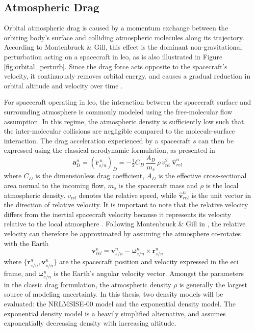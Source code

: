 \subsection{Atmospheric Drag}
\label{sec:atmospheric_drag}
Orbital atmospheric drag is caused by a momentum exchange between the orbiting body's surface and colliding atmospheric molecules along its trajectory. According to Montenbruck \& Gill, this effect is the dominant non-gravitational perturbation acting on a spacecraft in \gls{leo}, as is also illustrated in Figure \ref{fig:orbital_perturb}. Since the drag force acts opposite to the spacecraft's velocity, it continuously removes orbital energy, and causes a gradual reduction in orbital altitude and velocity over time \cite{vallado2001fundamentals, montenbruck2000, hystad2025}.

For spacecraft operating in \gls{leo}, the interaction between the spacecraft surface and surrounding atmosphere is commonly modeled using the free-molecular flow assumption. In this regime, the atmospheric density is sufficiently low such that the inter-molecular collisions are negligible compared to the molecule-surface interaction. The drag acceleration experienced by a spacecraft $s$ can then be expressed using the classical aerodynamic formulation, as presented in \cite{montenbruck2000}
\begin{equation}
    \mathbf{a}_{\text{D}}^n = \left(\ddot{\textbf{r}}^{\,n}_{s/n}\right)_{D} = -\tfrac{1}{2} C_D \, \frac{A_D}{m_s} \, \rho \, v_{\text{rel}}^{2} \, \hat{\textbf{v}}_{rel}^n
\label{eq:drag}
\end{equation}
where $C_D$ is the dimensionless drag coefficient, $A_D$ is the effective cross-sectional area normal to the incoming flow, $m_s$ is the spacecraft mass and $\rho$ is the local atmospheric density. $v_{\text{rel}}$ denotes the relative speed, while $\hat{\textbf{v}}_{rel}^n$ is the unit vector in the direction of relative velocity. It is important to note that the relative velocity differs from the inertial spacecraft velocity because it represents its velocity relative to the local atmosphere \cite{hystad2025}. Following Montenbruck \& Gill in \cite{montenbruck2000}, the relative velocity can therefore be approximated by assuming the atmosphere co-rotates with the Earth
\begin{equation}
\mathbf{v}_{rel}^n = \mathbf{v}^n_{s/n} - \boldsymbol{\omega}_{e/n}^n \times \mathbf{r}_{s/n}^n
\end{equation}
where $\{\textbf{r}^n_{s/n}, \textbf{v}^n_{s/n}\}$ are the spacecraft position and velocity expressed in the \gls{eci} frame, and $\boldsymbol{\omega}_{e/n}^n$ is the Earth's angular velocity vector. Amongst the parameters in the classic drag formulation, the atmospheric density $\rho$ is generally the largest source of modeling uncertainty. In this thesis, two density models will be evaluated: the NRLMSISE-00 model and the exponential density model. The exponential density model is a heavily simplified alternative, and assumes exponentially decreasing density with increasing altitude. 
